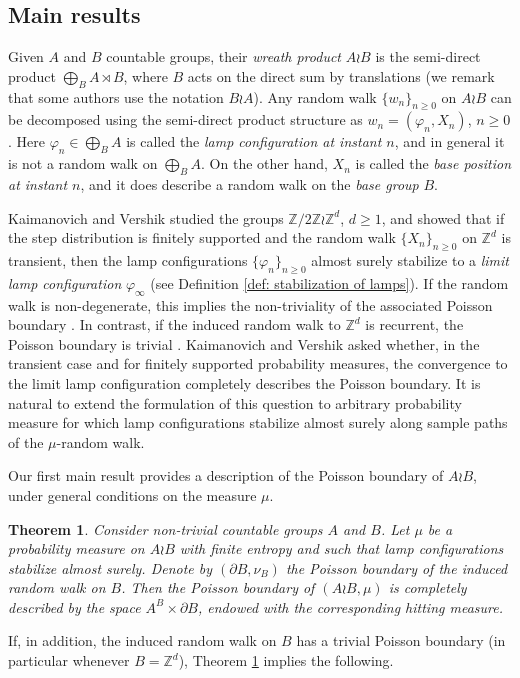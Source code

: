 \documentclass[reqno,oneside,11pt]{amsart}
\newcommand{\Z}{\mathbb{Z}}
\theoremstyle{plain}
\newtheorem{thm}{Theorem}[section] %
\theoremstyle{definition}
\begin{document}
\subsection{Main results}\label{subsection: main results}
Given $A$ and $B$ countable groups, their \emph{wreath product} $A\wr B$ is the semi-direct product $\bigoplus_{B}A\rtimes B$, where $B$ acts on the direct sum by translations (we remark that some authors use the notation $B\wr A$). Any random walk $\{w_n\}_{n\ge 0}$ on $A\wr B$ can be decomposed using the semi-direct product structure as $w_n=(\varphi_n,X_n)$, $n\ge 0$. Here $\varphi_n\in \bigoplus_{B}A$ is called the \emph{lamp configuration at instant $n$}, and in general it is not a random walk on $\bigoplus_{B}A$. On the other hand, $X_n$ is called the \emph{base position at instant $n$}, and it does describe a random walk on the \emph{base group} $B$. 

Kaimanovich and Vershik \cite[Section 6]{KaimanovcihVershik1983} studied the groups $\Z/2\Z\wr \Z^d$, $d\ge 1$, and showed that if the step distribution is finitely supported and the random walk $\{X_n\}_{n\ge 0}$ on $\Z^d$ is transient, then the lamp configurations $\{\varphi_n\}_{n\ge 0}$ almost surely stabilize to a \emph{limit lamp configuration} $\varphi_{\infty}$ (see Definition \ref{def: stabilization of lamps}). If the random walk is non-degenerate, this implies the non-triviality of the associated Poisson boundary \cite[Propositions 6.1 and 6.4]{KaimanovcihVershik1983}. In contrast, if the induced random walk to $\Z^d$ is recurrent, the Poisson boundary is trivial \cite[Proposition 6.3]{KaimanovcihVershik1983}. Kaimanovich and Vershik asked whether, in the transient case and for finitely supported probability measures, the convergence to the limit lamp configuration completely describes the Poisson boundary. It is natural to extend the formulation of this question to arbitrary probability measure for which lamp configurations stabilize almost surely along sample paths of the $\mu$-random walk. 

Our first main result provides a description of the Poisson boundary of $A\wr B$, under general conditions on the measure $\mu$. 
\begin{thm} \label{thm: lamplighter Poisson boundary}
	Consider non-trivial countable groups $A$ and $B$. Let $\mu$ be a probability measure on $A\wr B$ with finite entropy and such that lamp configurations stabilize almost surely. Denote by $(\partial B,\nu_B)$ the Poisson boundary of the induced random walk on $B$. Then the Poisson boundary of $(A\wr B,\mu)$ is completely described by the space $A^B \times \partial B$, endowed with the corresponding hitting measure.
\end{thm}
If, in addition, the induced random walk on $B$ has a trivial Poisson boundary (in particular whenever $B=\Z^d$), Theorem \ref{thm: lamplighter Poisson boundary} implies the following.
\end{document}
